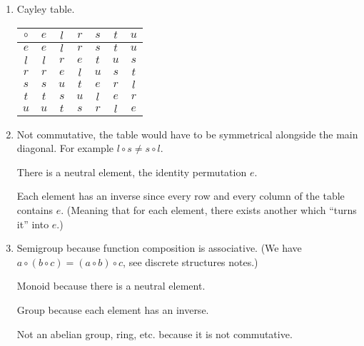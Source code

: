 \documentclass{article}
\begin{document}
\begin{enumerate}
    \item Cayley table.
    \begin{center}
        \begin{tabular}{c | c c c c c c}
            $\circ$ & $e$ & $l$ & $r$ & $s$ & $t$ & $u$ \\\midrule
            $e$ & $e$ & $l$ & $r$ & $s$ & $t$ & $u$ \\
            $l$ & $l$ & $r$ & $e$ & $t$ & $u$ & $s$ \\
            $r$ & $r$ & $e$ & $l$ & $u$ & $s$ & $t$ \\
            $s$ & $s$ & $u$ & $t$ & $e$ & $r$ & $l$ \\
            $t$ & $t$ & $s$ & $u$ & $l$ & $e$ & $r$ \\
            $u$ & $u$ & $t$ & $s$ & $r$ & $l$ & $e$ \\
        \end{tabular}
    \end{center}

    \item Not commutative, the table would have to be symmetrical alongside the main diagonal. For example $l \circ s \neq s \circ l$.
    
    There is a neutral element, the identity permutation $e$.

    Each element has an inverse since every row and every column of the table contains $e$. (Meaning that for each element, there exists another which \enquote{turns it} into $e$.)
    
    \item Semigroup because function composition is associative. (We have $a \circ (b \circ c) = (a \circ b) \circ c$, see discrete structures notes.)
    
    Monoid because there is a neutral element.

    Group because each element has an inverse.

    Not an abelian group, ring, etc. because it is not commutative.
\end{enumerate}

\pagebreak
\end{document}
